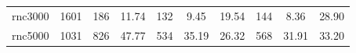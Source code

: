 \documentclass[10pt,journal]{IEEEtran}
\begin{document}
\begin{table}[!h]
\begin{tabular}{c|c|c|c|c|c|c|c|c|c}
\hspace*{-1em}rnc3000\hspace*{-1em}           &\hspace*{-1em}1601\hspace*{-1em}  &\hspace*{-0.5em}186\hspace*{-0.5em}  &\hspace*{-0.5em}11.74\hspace*{-0.5em}  &\hspace*{-0.5em}132\hspace*{-0.5em}   &\hspace*{-0.8em}9.45\hspace*{-0.8em}  &\hspace*{-0.8em}19.54\hspace*{-0.8em}  &\hspace*{-0.5em}144\hspace*{-0.5em}   &\hspace*{-0.8em}8.36\hspace*{-0.8em}  &\hspace*{-0.8em} 28.90 \hspace*{-0.8em} \\



\hspace*{-1em}rnc5000\hspace*{-1em}             &\hspace*{-1em}1031\hspace*{-1em}  &\hspace*{-0.5em}826\hspace*{-0.5em}  &\hspace*{-0.5em}47.77\hspace*{-0.5em}  &\hspace*{-0.5em}534\hspace*{-0.5em}  &\hspace*{-1em}35.19\hspace*{-1em}   & \hspace*{-0.8em}26.32\hspace*{-0.8em} &\hspace*{-0.5em}568\hspace*{-0.5em}  &\hspace*{-1em}31.91\hspace*{-1em}  &\hspace*{-0.8em}33.20\hspace*{-0.8em}  \\



\end{tabular}
\end{table}
\end{document}
